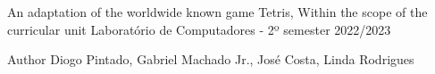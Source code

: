An adaptation of the worldwide known game Tetris, Within the scope of the curricular unit Laboratório de Computadores -\/ 2º semester 2022/2023

\begin{DoxyAuthor}{Author}
Diogo Pintado, Gabriel Machado Jr., José Costa, Linda Rodrigues 
\end{DoxyAuthor}
